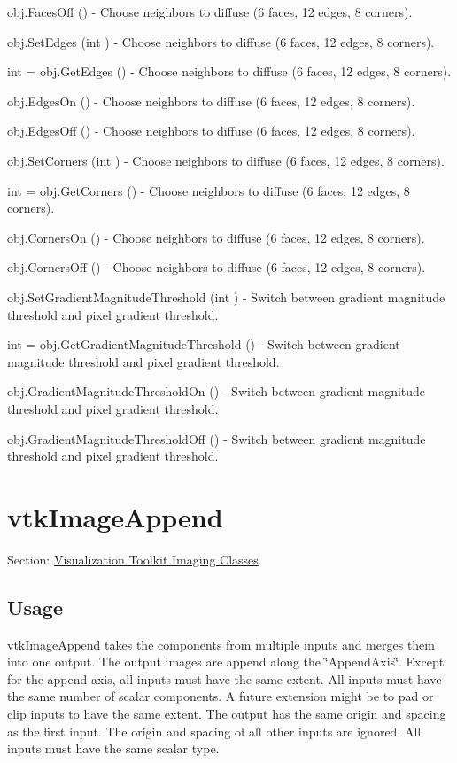 \begin{DoxyItemize}
\item {\ttfamily obj.\-Faces\-Off ()} -\/ Choose neighbors to diffuse (6 faces, 12 edges, 8 corners).  
\item {\ttfamily obj.\-Set\-Edges (int )} -\/ Choose neighbors to diffuse (6 faces, 12 edges, 8 corners).  
\item {\ttfamily int = obj.\-Get\-Edges ()} -\/ Choose neighbors to diffuse (6 faces, 12 edges, 8 corners).  
\item {\ttfamily obj.\-Edges\-On ()} -\/ Choose neighbors to diffuse (6 faces, 12 edges, 8 corners).  
\item {\ttfamily obj.\-Edges\-Off ()} -\/ Choose neighbors to diffuse (6 faces, 12 edges, 8 corners).  
\item {\ttfamily obj.\-Set\-Corners (int )} -\/ Choose neighbors to diffuse (6 faces, 12 edges, 8 corners).  
\item {\ttfamily int = obj.\-Get\-Corners ()} -\/ Choose neighbors to diffuse (6 faces, 12 edges, 8 corners).  
\item {\ttfamily obj.\-Corners\-On ()} -\/ Choose neighbors to diffuse (6 faces, 12 edges, 8 corners).  
\item {\ttfamily obj.\-Corners\-Off ()} -\/ Choose neighbors to diffuse (6 faces, 12 edges, 8 corners).  
\item {\ttfamily obj.\-Set\-Gradient\-Magnitude\-Threshold (int )} -\/ Switch between gradient magnitude threshold and pixel gradient threshold.  
\item {\ttfamily int = obj.\-Get\-Gradient\-Magnitude\-Threshold ()} -\/ Switch between gradient magnitude threshold and pixel gradient threshold.  
\item {\ttfamily obj.\-Gradient\-Magnitude\-Threshold\-On ()} -\/ Switch between gradient magnitude threshold and pixel gradient threshold.  
\item {\ttfamily obj.\-Gradient\-Magnitude\-Threshold\-Off ()} -\/ Switch between gradient magnitude threshold and pixel gradient threshold.  
\end{DoxyItemize}\hypertarget{vtkimaging_vtkimageappend}{}\section{vtk\-Image\-Append}\label{vtkimaging_vtkimageappend}
Section\-: \hyperlink{sec_vtkimaging}{Visualization Toolkit Imaging Classes} \hypertarget{vtkwidgets_vtkxyplotwidget_Usage}{}\subsection{Usage}\label{vtkwidgets_vtkxyplotwidget_Usage}
vtk\-Image\-Append takes the components from multiple inputs and merges them into one output. The output images are append along the \char`\"{}\-Append\-Axis\char`\"{}. Except for the append axis, all inputs must have the same extent. All inputs must have the same number of scalar components. A future extension might be to pad or clip inputs to have the same extent. The output has the same origin and spacing as the first input. The origin and spacing of all other inputs are ignored. All inputs must have the same scalar type.

